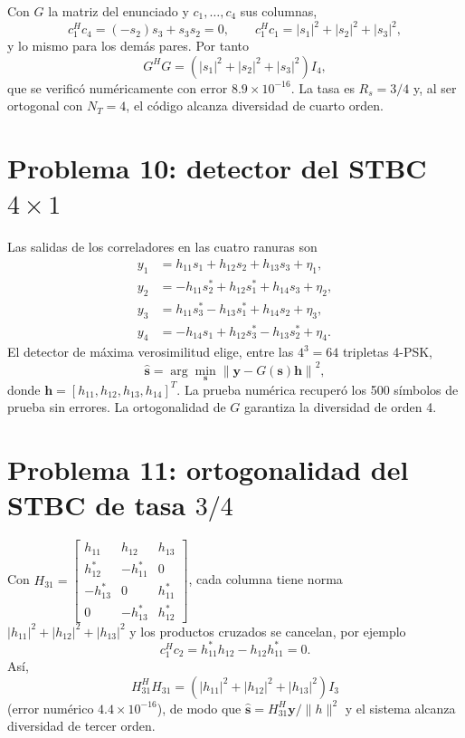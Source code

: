 \documentclass[11pt,a4paper]{article}
\begin{document}
Con $G$ la matriz del enunciado y $c_1,\dots,c_4$ sus columnas,
\begin{equation}
  c_1^Hc_4=(-s_2)s_3+s_3s_2=0,\qquad
  c_1^Hc_1=|s_1|^2+|s_2|^2+|s_3|^2,
\end{equation}
y lo mismo para los demás pares. Por tanto
\begin{equation}
  G^HG=\left(|s_1|^2+|s_2|^2+|s_3|^2\right)I_4 ,
\end{equation}
que se verificó numéricamente con error $8.9\times10^{-16}$. La tasa es
$R_s=3/4$ y, al ser ortogonal con $N_T=4$, el código alcanza diversidad de
cuarto orden.

\section*{Problema 10: detector del STBC $4\times1$}

Las salidas de los correladores en las cuatro ranuras son
\begin{align}
  y_1&=h_{11}s_1+h_{12}s_2+h_{13}s_3+\eta_1,\\
  y_2&=-h_{11}s_2^*+h_{12}s_1^*+h_{14}s_3+\eta_2,\\
  y_3&=h_{11}s_3^*-h_{13}s_1^*+h_{14}s_2+\eta_3,\\
  y_4&=-h_{14}s_1+h_{12}s_3^*-h_{13}s_2^*+\eta_4.
\end{align}
El detector de máxima verosimilitud elige, entre las $4^3=64$ tripletas
4-PSK,
\begin{equation}
  \hat{\mathbf s}=\arg\min_{\mathbf s}\left\|\mathbf y-G(\mathbf s)\mathbf h\right\|^2,
\end{equation}
donde $\mathbf h=[h_{11},h_{12},h_{13},h_{14}]^T$. La prueba numérica
recuperó los 500 símbolos de prueba sin errores. La ortogonalidad de $G$
garantiza la diversidad de orden 4.

\section*{Problema 11: ortogonalidad del STBC de tasa $3/4$}

Con
$H_{31}=\begin{bmatrix}h_{11}&h_{12}&h_{13}\\h_{12}^*&-h_{11}^*&0\\-h_{13}^*&0&h_{11}^*\\0&-h_{13}^*&h_{12}^*\end{bmatrix}$,
cada columna tiene norma $|h_{11}|^2+|h_{12}|^2+|h_{13}|^2$ y los productos
cruzados se cancelan, por ejemplo
\begin{equation}
  c_1^Hc_2=h_{11}^*h_{12}-h_{12}h_{11}^*=0.
\end{equation}
Así,
\begin{equation}
  H_{31}^HH_{31}=\left(|h_{11}|^2+|h_{12}|^2+|h_{13}|^2\right)I_3
\end{equation}
(error numérico $4.4\times10^{-16}$), de modo que
$\hat{\mathbf s}=H_{31}^H\mathbf y/\|h\|^2$ y el sistema alcanza diversidad
de tercer orden.
\end{document}
